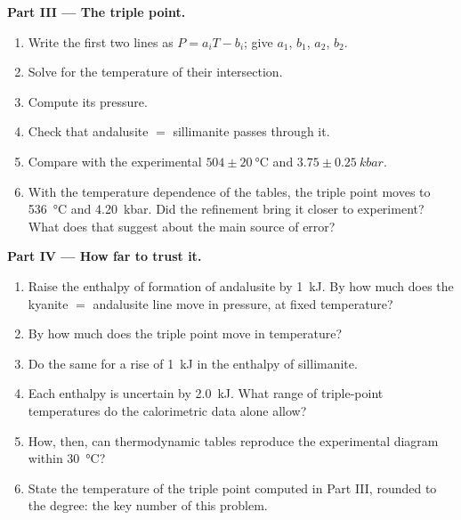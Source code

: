 \begin{problem}
\noindent\textbf{Part III --- The triple point.}
\begin{enumerate}[resume]
\item Write the first two lines as $P = a_i T - b_i$; give $a_1$, $b_1$, $a_2$, $b_2$.
\item Solve for the temperature of their intersection.
\item Compute its pressure.
\item Check that andalusite $=$ sillimanite passes through it.
\item Compare with the experimental $504 \pm \qty{20}{\celsius}$ and $3.75 \pm
\qty{0.25}{kbar}$.
\item With the temperature dependence of the tables, the triple point moves to
\qty{536}{\celsius} and \qty{4.20}{kbar}. Did the refinement bring it closer to
experiment? What does that suggest about the main source of error?
\end{enumerate}

\noindent\textbf{Part IV --- How far to trust it.}
\begin{enumerate}[resume]
\item Raise the enthalpy of formation of andalusite by \qty{1}{kJ}. By how much does
the kyanite $=$ andalusite line move in pressure, at fixed temperature?
\item By how much does the triple point move in temperature?
\item Do the same for a rise of \qty{1}{kJ} in the enthalpy of sillimanite.
\item Each enthalpy is uncertain by \qty{2.0}{kJ}. What range of triple-point
temperatures do the calorimetric data alone allow?
\item How, then, can thermodynamic tables reproduce the experimental diagram within
\qty{30}{\celsius}?
\item State the temperature of the triple point computed in Part III, rounded to the
degree: the key number of this problem.
\end{enumerate}
\end{problem}
